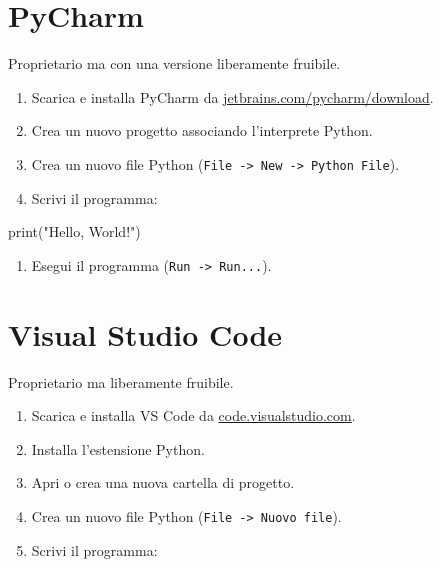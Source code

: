\documentclass[
  letterpaper,
]{scrbook}
\newenvironment{Shaded}{\begin{snugshade}}{\end{snugshade}}
\newcommand{\BuiltInTok}[1]{\textcolor[rgb]{0.00,0.23,0.31}{#1}}
\newcommand{\NormalTok}[1]{\textcolor[rgb]{0.00,0.23,0.31}{#1}}
\newcommand{\StringTok}[1]{\textcolor[rgb]{0.13,0.47,0.30}{#1}}
\providecommand{\tightlist}{%
  \setlength{\itemsep}{0pt}\setlength{\parskip}{0pt}}\usepackage{longtable,booktabs,array}
\begin{document}
\section{PyCharm}

Proprietario ma con una versione liberamente fruibile.

\begin{enumerate}
\def\labelenumi{\arabic{enumi}.}
\tightlist
\item
  Scarica e installa PyCharm da
  \href{https://www.jetbrains.com/pycharm/download/}{jetbrains.com/pycharm/download}.
\item
  Crea un nuovo progetto associando l'interprete Python.
\item
  Crea un nuovo file Python
  (\texttt{File\ -\textgreater{}\ New\ -\textgreater{}\ Python\ File}).
\item
  Scrivi il programma:
\end{enumerate}

\begin{Shaded}
\begin{Highlighting}[]
\BuiltInTok{print}\NormalTok{(}\StringTok{"Hello, World!"}\NormalTok{)}
\end{Highlighting}
\end{Shaded}

\begin{enumerate}
\def\labelenumi{\arabic{enumi}.}
\setcounter{enumi}{4}
\tightlist
\item
  Esegui il programma (\texttt{Run\ -\textgreater{}\ Run...}).
\end{enumerate}

\section{Visual Studio Code}

Proprietario ma liberamente fruibile.

\begin{enumerate}
\def\labelenumi{\arabic{enumi}.}
\tightlist
\item
  Scarica e installa VS Code da
  \href{https://code.visualstudio.com/}{code.visualstudio.com}.
\item
  Installa l'estensione Python.
\item
  Apri o crea una nuova cartella di progetto.
\item
  Crea un nuovo file Python
  (\texttt{File\ -\textgreater{}\ Nuovo\ file}).
\item
  Scrivi il programma:
\end{enumerate}
\end{document}
